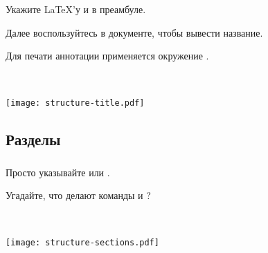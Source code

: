 \documentclass{beamer}
\begin{document}
\begin{frame}[fragile]
\frametitle{\insertsubsection}
\vspace{-2ex}
\begin{itemize}{\small
\item Укажите \LaTeX{}'у  и  в преамбуле.
\item Далее воспользуйтесь  в документе, чтобы вывести название.
\item Для печати аннотации применяется окружение .
}\end{itemize}
\vspace{-2ex}
\begin{minipage}{0.55\linewidth}
\end{minipage}~~%
\begin{minipage}{0.45\linewidth}
\texttt{[image: structure-title.pdf]}
\end{minipage}
\end{frame}

\subsection{Разделы}

\begin{frame}[fragile]
\frametitle{\insertsubsection}
\vspace{-2ex}
\begin{itemize}{\small
\item Просто указывайте  или .
\item Угадайте, что делают команды  и ?
}\end{itemize}
\begin{minipage}{0.55\linewidth}
\end{minipage}~~%
\begin{minipage}{0.45\linewidth}
\texttt{[image: structure-sections.pdf]}
\end{minipage}
\end{frame}

\end{document}
